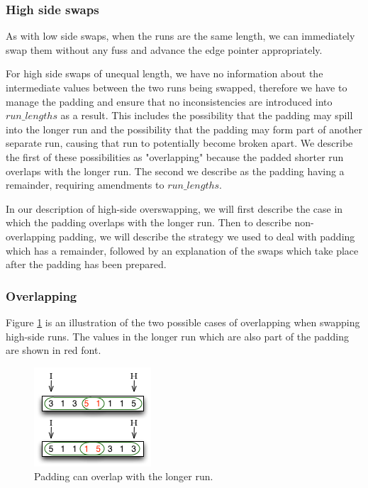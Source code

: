 \subsubsection{High side swaps}

As with low side swaps, when the runs are the same length, we can immediately swap them without any fuss and advance the edge pointer appropriately.

For high side swaps of unequal length, we have no information about the intermediate values between the two runs being swapped, therefore we have to manage the padding and ensure that no inconsistencies are introduced into $run\_lengths$ as a result. This includes the possibility that the padding may spill into the longer run and the possibility that the padding may form part of another separate run, causing that run to potentially become broken apart. We describe the first of these possibilities as "overlapping" because the padded shorter run overlaps with the longer run. The second we describe as the padding having a remainder, requiring amendments to $run\_lengths$.

In our description of high-side overswapping, we will first describe the case in which the padding overlaps with the longer run. Then to describe non-overlapping padding, we will describe the strategy we used to deal with padding which has a remainder, followed by an explanation of the swaps which take place after the padding has been prepared.

\subsubsection{Overlapping}

Figure \ref{fig:overswapping_overlapping} is an illustration of the two possible cases of overlapping when swapping high-side runs. The values in the longer run which are also part of the padding are shown in red font.

\begin{figure}[H]
  \centering
  \includegraphics[]{images/d20_overswapping_overlapping}
  \caption{Padding can overlap with the longer run.}
  \label{fig:overswapping_overlapping}
\end{figure}

